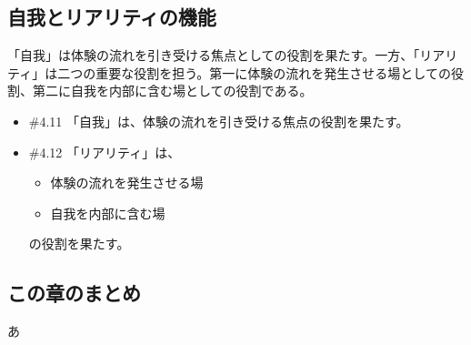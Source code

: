 \subsection{自我とリアリティの機能}\label{ux81eaux6211ux3068ux30eaux30a2ux30eaux30c6ux30a3ux306eux6a5fux80fd}

「自我」は体験の流れを引き受ける焦点としての役割を果たす。一方、「リアリティ」は二つの重要な役割を担う。第一に体験の流れを発生させる場としての役割、第二に自我を内部に含む場としての役割である。

\begin{note}{}
  \begin{itemize}
    \tightlist
    \item{\#4.11}
      「自我」は、体験の流れを引き受ける焦点の役割を果たす。
    \item{\#4.12}
      「リアリティ」は、
      \begin{itemize}
        \tightlist
        \item
          体験の流れを発生させる場
        \item
          自我を内部に含む場
      \end{itemize}
      の役割を果たす。
  \end{itemize}
\end{note}

\subsection{この章のまとめ}\label{ux3053ux306eux7ae0ux306eux307eux3068ux3081}

あ
